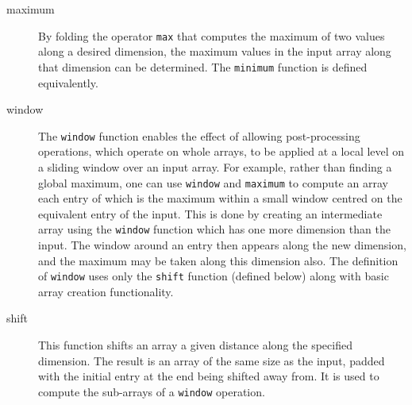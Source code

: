 \documentclass[preprint,authoryear,12pt]{elsarticle}
\newcommand{\code}[1]{\texttt{#1}}
\begin{document}
\begin{description}
\item[maximum]
  By folding the operator \code{max} that computes the maximum of two values along a desired dimension, the maximum values in the input array along that dimension can be determined.
  The \code{minimum} function is defined equivalently.

\item[window]
  The \code{window} function enables the effect of allowing post-processing operations, which operate on whole arrays, to be applied at a local level on a sliding window over an input array.
  For example, rather than finding a global maximum, one can use \code{window} and \code{maximum} to compute an array each entry of which is the maximum within a small window centred on the equivalent entry of the input.
  This is done by creating an intermediate array using the \code{window} function which has one more dimension than the input.
  The window around an entry then appears along the new dimension, and the maximum may be taken along this dimension also.
  The definition of \code{window} uses only the \code{shift} function (defined below) along with basic array creation functionality.

\item[shift]
  This function shifts an array a given distance along the specified dimension.
  The result is an array of the same size as the input, padded with the initial entry at the end being shifted away from.
  It is used to compute the sub-arrays of a \code{window} operation.


\end{description}
\end{document}

